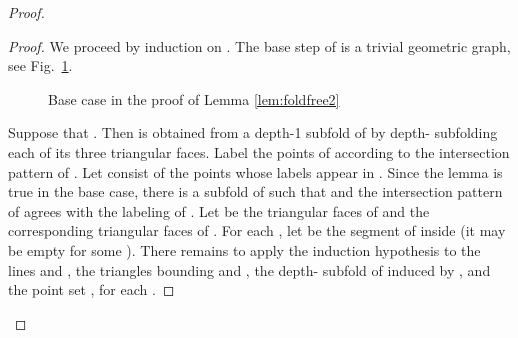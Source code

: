 \documentclass[reqno,12pt]{amsart}
\begin{document}
\begin{proof}
\begin{proof}
We proceed by induction on . The base step of  is a trivial
geometric graph, see Fig.~\ref{fig:basecase}.
\begin{figure}
\centering
\hfill
\hfill
\caption{Base case in the proof of Lemma \protect\ref{lem:foldfree2}}
\label{fig:basecase}
\end{figure}
Suppose that . Then  is obtained from a depth-1 subfold  of 
by depth- subfolding each of its three triangular faces. Label
the points of  according to the intersection pattern of .
Let  consist of the points whose labels appear in .
Since the lemma is true in the base case, there is a subfold  of 
such that  and the intersection pattern of 
agrees with the labeling of .
Let  be the triangular faces of  and 
the corresponding triangular faces of .
For each , let  be the segment of  inside 
(it may be empty for some ). There remains to apply the induction hypothesis
to the lines  and , the triangles bounding  and ,
the depth- subfold of  induced by , and the point set ,
for each .
\end{proof}



\end{proof}
\end{document}
